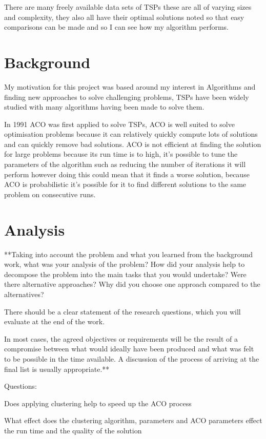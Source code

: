 There are many freely available data sets of TSPs\cite{tsp_test_data_2009} these are all of varying sizes and complexity, they also all have their optimal solutions noted so that easy comparisons can be made and so I can see how my algorithm performs. 

\section{Background}
My motivation for this project was based around my interest in Algorithms and finding new approaches to solve challenging problems, TSPs have been widely studied with many algorithms having been made to solve them. 

In 1991 ACO was first applied to solve TSPs\cite{dorigo1991distributed}, ACO is well suited to solve optimisation problems because it can relatively quickly compute lots of solutions and can quickly remove bad solutions. ACO is not efficient at finding the solution for large problems because its run time is to high, it's possible to tune the parameters of the algorithm such as reducing the number of iterations it will perform however doing this could mean that it finds a worse solution, because ACO is probabilistic it's possible for it to find different solutions to the same problem on consecutive runs. 

\section{Analysis}
**Taking into account the problem and what you learned from the background work, what was your analysis of the problem? How did your analysis help to decompose the problem into the main tasks that you would undertake? Were there alternative approaches? Why did you choose one approach compared to the alternatives? 

There should be a clear statement of the research questions, which you will evaluate at the end of the work. 

In most cases, the agreed objectives or requirements will be the result of a compromise between what would ideally have been produced and what was felt to be possible in the time available. A discussion of the process of arriving at the final list is usually appropriate.**

Questions:

Does applying clustering help to speed up the ACO process

What effect does the clustering algorithm, parameters and ACO parameters effect the run time and the quality of the solution

